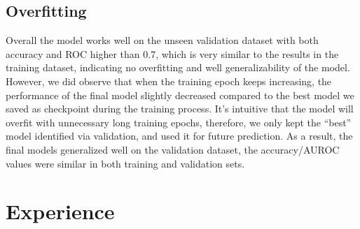 \documentclass[10pt,twocolumn,letterpaper]{article}
\begin{document}
\subsection{Overfitting}
Overall the model works well on the unseen validation dataset with both accuracy and ROC higher than 0.7, which is very similar to the results in the training dataset, indicating no overfitting and well generalizability of the model. However, we did observe that when the training epoch keeps increasing, the performance of the final model slightly decreased compared to the best model we saved as checkpoint during the training process. It’s intuitive that the model will overfit with unnecessary long training epochs, therefore, we only kept the “best” model identified via validation, and used it for future prediction. As a result, the final models generalized well on the validation dataset, the accuracy/AUROC values were similar in both training and validation sets. 

\section{Experience}
\end{document}
